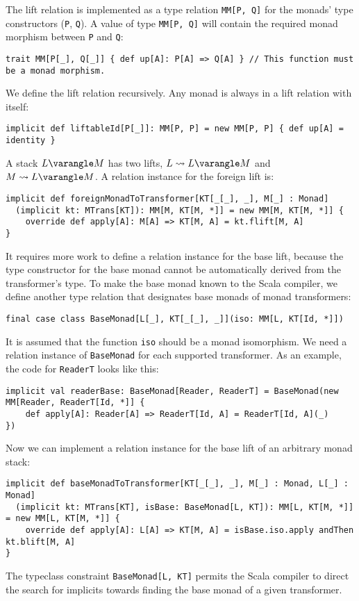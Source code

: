 The lift relation is implemented as a type relation \lstinline!MM[P, Q]!
for the monads\textsf{'} type constructors (\lstinline!P!, \lstinline!Q!).
A value of type \lstinline!MM[P, Q]! will contain the required monad
morphism between \lstinline!P! and \lstinline!Q!:
\begin{lstlisting}
trait MM[P[_], Q[_]] { def up[A]: P[A] => Q[A] } // This function must be a monad morphism.
\end{lstlisting}
We define the lift relation recursively. Any monad is always in a
lift relation with itself:
\begin{lstlisting}
implicit def liftableId[P[_]]: MM[P, P] = new MM[P, P] { def up[A] = identity }
\end{lstlisting}
A stack $L\varangle M$ has two lifts, $L\leadsto L\varangle M$ and
$M\leadsto L\varangle M$. A relation instance for the foreign lift
is:
\begin{lstlisting}
implicit def foreignMonadToTransformer[KT[_[_], _], M[_] : Monad]
  (implicit kt: MTrans[KT]): MM[M, KT[M, *]] = new MM[M, KT[M, *]] {
    override def apply[A]: M[A] => KT[M, A] = kt.flift[M, A]
}
\end{lstlisting}
It requires more work to define a relation instance for the base lift,
because the type constructor for the base monad cannot be automatically
derived from the transformer\textsf{'}s type. To make the base monad known
to the Scala compiler, we define another type relation that designates
base monads of monad transformers:
\begin{lstlisting}
final case class BaseMonad[L[_], KT[_[_], _]](iso: MM[L, KT[Id, *]])
\end{lstlisting}
It is assumed that the function \lstinline!iso! should be a monad
isomorphism. We need a relation instance of \lstinline!BaseMonad!
for each supported transformer. As an example, the code for \lstinline!ReaderT!
looks like this:
\begin{lstlisting}
implicit val readerBase: BaseMonad[Reader, ReaderT] = BaseMonad(new MM[Reader, ReaderT[Id, *]] {
    def apply[A]: Reader[A] => ReaderT[Id, A] = ReaderT[Id, A](_)
})
\end{lstlisting}

Now we can implement a relation instance for the base lift of an arbitrary
monad stack:
\begin{lstlisting}
implicit def baseMonadToTransformer[KT[_[_], _], M[_] : Monad, L[_] : Monad]
  (implicit kt: MTrans[KT], isBase: BaseMonad[L, KT]): MM[L, KT[M, *]] = new MM[L, KT[M, *]] {
    override def apply[A]: L[A] => KT[M, A] = isBase.iso.apply andThen kt.blift[M, A]
}
\end{lstlisting}
The typeclass constraint \lstinline!BaseMonad[L, KT]! permits the
Scala compiler to direct the search for implicits towards finding
the base monad of a given transformer.

